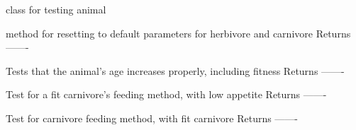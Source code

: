 \documentclass[a4paper,10pt,english]{sphinxmanual}
\begin{document}
\begin{fulllineitems}
\label{\detokenize{tests:biosim.tests.test_animals.TestAnimal}}
class for testing animal

\begin{fulllineitems}
\label{\detokenize{tests:biosim.tests.test_animals.TestAnimal.set_default_animal}}
method for resetting to default parameters for herbivore and carnivore
Returns
-------

\end{fulllineitems}


\begin{fulllineitems}
\label{\detokenize{tests:biosim.tests.test_animals.TestAnimal.test_aging}}
Tests that the animal's age increases properly, including fitness
Returns
-------

\end{fulllineitems}


\begin{fulllineitems}
\label{\detokenize{tests:biosim.tests.test_animals.TestAnimal.test_feeding_carnivore_appetite}}
Test for a fit carnivore's feeding method, with low appetite
Returns
-------

\end{fulllineitems}


\begin{fulllineitems}
\label{\detokenize{tests:biosim.tests.test_animals.TestAnimal.test_feeding_carnivore_fit}}
Test for carnivore feeding method, with fit carnivore
Returns
-------

\end{fulllineitems}



\end{fulllineitems}
\end{document}
